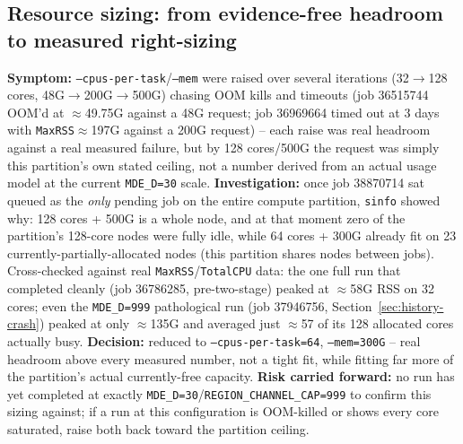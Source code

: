 \documentclass[11pt]{article}
\begin{document}
\subsection{Resource sizing: from evidence-free headroom to measured right-sizing}
\label{sec:history-resources}
\textbf{Symptom:} \texttt{--cpus-per-task}/\texttt{--mem} were raised over several iterations (32$\to$128 cores, 48G$\to$200G$\to$500G) chasing OOM kills and timeouts (job 36515744 OOM'd at $\approx$49.75G against a 48G request; job 36969664 timed out at 3 days with \texttt{MaxRSS}$\approx$197G against a 200G request) -- each raise was real headroom against a real measured failure, but by 128 cores/500G the request was simply this partition's own stated ceiling, not a number derived from an actual usage model at the current \texttt{MDE\_D=30} scale. \textbf{Investigation:} once job 38870714 sat queued as the \emph{only} pending job on the entire compute partition, \texttt{sinfo} showed why: 128 cores + 500G is a whole node, and at that moment zero of the partition's 128-core nodes were fully idle, while 64 cores + 300G already fit on 23 currently-partially-allocated nodes (this partition shares nodes between jobs). Cross-checked against real \texttt{MaxRSS}/\texttt{TotalCPU} data: the one full run that completed cleanly (job 36786285, pre-two-stage) peaked at $\approx$58G RSS on 32 cores; even the \texttt{MDE\_D=999} pathological run (job 37946756, Section~\ref{sec:history-crash}) peaked at only $\approx$135G and averaged just $\approx$57 of its 128 allocated cores actually busy. \textbf{Decision:} reduced to \texttt{--cpus-per-task=64}, \texttt{--mem=300G} -- real headroom above every measured number, not a tight fit, while fitting far more of the partition's actual currently-free capacity. \textbf{Risk carried forward:} no run has yet completed at exactly \texttt{MDE\_D=30}/\texttt{REGION\_CHANNEL\_CAP=999} to confirm this sizing against; if a run at this configuration is OOM-killed or shows every core saturated, raise both back toward the partition ceiling.
\end{document}
